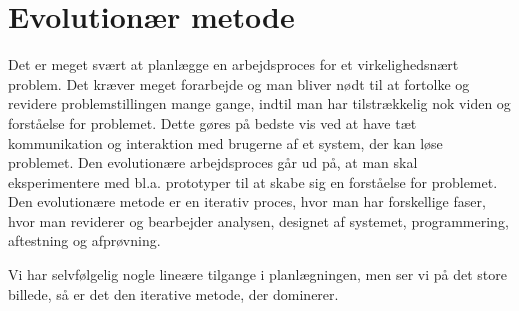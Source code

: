 \section{Evolutionær metode}
\label{sec:evolution}

Det er meget svært at planlægge en arbejdsproces for et virkelighedsnært problem. Det kræver meget forarbejde og man bliver nødt til at fortolke og revidere problemstillingen mange gange, indtil man har tilstrækkelig nok viden og forståelse for problemet. Dette gøres på bedste vis ved at have tæt kommunikation og interaktion med brugerne af et system, der kan løse problemet. Den evolutionære arbejdsproces går ud på, at man skal eksperimentere med bl.a. prototyper til at skabe sig en forståelse for problemet. Den evolutionære metode er en iterativ proces, hvor man har forskellige faser, hvor man reviderer og bearbejder analysen, designet af systemet, programmering, aftestning og afprøvning.

Vi har selvfølgelig nogle lineære tilgange i planlægningen, men ser vi på det store billede, så er det den iterative metode, der dominerer.






